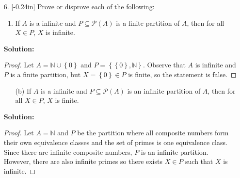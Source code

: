 \documentclass[letterpaper,12pt]{article}
\newcommand{\set}[1]{\left\{ #1 \right\}}
\theoremstyle{definition}
\begin{document}
\pagebreak
\begin{enumerate}
    \item[6.] \reversemarginpar{}[-0.24in] Prove or disprove each of the following: \begin{enumerate}
        \item If $A$ is a infinite and $P \subseteq \mathcal{P}(A)$ is a finite partition of $A$, then for all $X \in P$, $X$ is infinite.
    \end{enumerate}
    \begin{mdframed}
            \textbf{Solution:}
            \renewcommand{\proofname}{Disproof}
            \begin{proof}
                Let $A = \mathbb{N}\cup\set{0}$ and $P = \set{\set{0},\mathbb{N}}$. Observe that $A$ is infinite and $P$ is a finite partition, but $X = \set{0} \in P$ is finite, so the statement is false.
            \end{proof}
        \end{mdframed}
\end{enumerate}
\pagebreak
\begin{enumerate}
    \item[] \begin{enumerate}
        \item[(b)] If $A$ is a infinite and $P \subseteq \mathcal{P}(A)$ is an infinite partition of $A$, then for all $X \in P$, $X$ is finite.
    \end{enumerate}
    \begin{mdframed}
            \textbf{Solution:}
            \renewcommand{\proofname}{Disproof}
            \begin{proof}
                Let $A = \mathbb{N}$ and $P$ be the partition where all composite numbers form their own equivalence classes and the set of primes is one equivalence class. Since there are infinite composite numbers, $P$ is an infinite partition. However, there are also infinite primes so there exists $X \in P$ such that $X$ is infinite.
            \end{proof}
        \end{mdframed}
\end{enumerate}
\pagebreak
\end{document}
